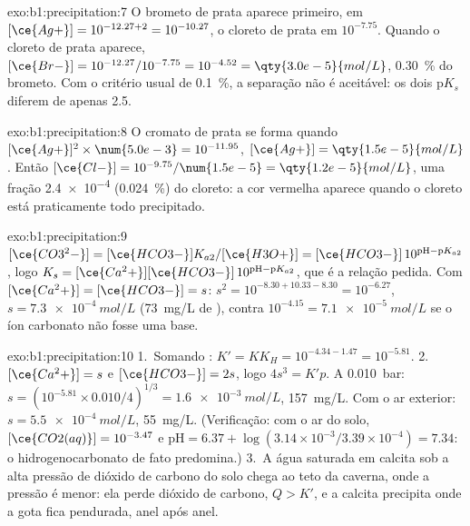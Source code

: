 \begin{solution}{exo:b1:precipitation:7}
O brometo de prata aparece primeiro, em $[\ce{Ag+}] = 10^{-12.27 + 2} =
10^{-10.27}$, o cloreto de prata em $10^{-7.75}$. Quando o cloreto de
prata aparece, $[\ce{Br-}] = 10^{-12.27}/10^{-7.75} = 10^{-4.52} =
\qty{3.0e-5}{mol/L}$, \qty{0.30}{\percent} do brometo. Com o critério
usual de \qty{0.1}{\percent}, a separação não é aceitável: os dois
$\mathrm{p}K_s$ diferem de apenas 2.5.
\end{solution}

\begin{solution}{exo:b1:precipitation:8}
O cromato de prata se forma quando $[\ce{Ag+}]^2 \times \num{5.0e-3} = 10^{-11.95}$,
$[\ce{Ag+}] = \qty{1.5e-5}{mol/L}$. Então $[\ce{Cl-}] = 10^{-9.75}/\num{1.5e-5}
= \qty{1.2e-5}{mol/L}$, uma fração \num{2.4e-4} (\qty{0.024}{\percent}) do
cloreto: a cor vermelha aparece quando o cloreto está praticamente todo
precipitado.
\end{solution}

\begin{solution}{exo:b1:precipitation:9}
$[\ce{CO3^2-}] = [\ce{HCO3-}]K_{a2}/[\ce{H3O+}] = [\ce{HCO3-}]\,10^{\mathrm{pH}
- \mathrm{p}K_{a2}}$, logo $K_s = [\ce{Ca^2+}][\ce{HCO3-}]\,10^{\mathrm{pH} -
\mathrm{p}K_{a2}}$, que é a relação pedida. Com $[\ce{Ca^2+}] =
[\ce{HCO3-}] = s$: $s^2 = 10^{-8.30 + 10.33 - 8.30} = 10^{-6.27}$,
$s = \qty{7.3e-4}{mol/L}$ (\qty{73}{mg/L} de ), contra
$10^{-4.15} = \qty{7.1e-5}{mol/L}$ se o íon carbonato não fosse uma base.
\end{solution}

\begin{solution}{exo:b1:precipitation:10}
1.~Somando : $K' = K K_H = 10^{-4.34 - 1.47} =
10^{-5.81}$.
2.~$[\ce{Ca^2+}] = s$ e $[\ce{HCO3-}] = 2s$, logo $4s^3 = K'p$. A
\qty{0.010}{bar}: $s = (10^{-5.81} \times 0.010/4)^{1/3} =
\qty{1.6e-3}{mol/L}$, \qty{157}{mg/L}. Com o ar exterior:
$s = \qty{5.5e-4}{mol/L}$, \qty{55}{mg/L}. (Verificação: com o ar do solo,
$[\ce{CO2(aq)}] = 10^{-3.47}$ e $\mathrm{pH} = 6.37 + \log(3.14\times
10^{-3}/3.39 \times 10^{-4}) = 7.34$: o hidrogenocarbonato de fato predomina.)
3.~A água saturada em calcita sob a alta pressão de dióxido de carbono
do solo chega ao teto da caverna, onde a pressão é menor: ela perde
dióxido de carbono, $Q > K'$, e a calcita precipita onde a gota fica
pendurada, anel após anel.
\end{solution}

